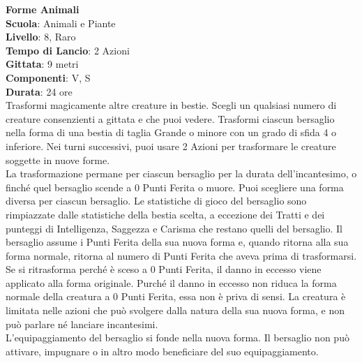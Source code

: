 \begin{multicols}{2}
\medskip\textbf{Forme Animali}\\
\textbf{Scuola}: Animali e Piante\\
\textbf{Livello}: 8, Raro\\
\textbf{Tempo di Lancio}: 2 Azioni\\
\textbf{Gittata}: 9 metri\\
\textbf{Componenti}: V, S\\
\textbf{Durata}: 24 ore\\
Trasformi magicamente altre creature in bestie. Scegli un qualsiasi numero di creature consenzienti a gittata e che puoi vedere. Trasformi ciascun bersaglio nella forma di una bestia di taglia Grande o minore con un grado di sfida 4 o inferiore. Nei turni successivi, puoi usare 2 Azioni per trasformare le creature soggette in nuove forme.\\
La trasformazione permane per ciascun bersaglio per la durata dell'incantesimo, o finché quel bersaglio scende a 0 Punti Ferita o muore. Puoi scegliere una forma diversa per ciascun bersaglio. Le statistiche di gioco del bersaglio sono rimpiazzate dalle statistiche della bestia scelta, a eccezione dei Tratti e dei punteggi di Intelligenza, Saggezza e Carisma che restano quelli del
bersaglio. Il bersaglio assume i Punti Ferita della sua nuova forma e, quando ritorna alla sua forma normale, ritorna al numero di Punti Ferita che aveva prima di trasformarsi. Se si ritrasforma perché è sceso a 0 Punti Ferita, il danno in eccesso viene applicato alla forma originale. Purché il danno in eccesso non riduca la forma normale della creatura a 0 Punti Ferita, essa non è priva di sensi. La creatura è limitata nelle azioni che può svolgere dalla natura della sua nuova forma, e non può parlare né lanciare incantesimi.\\
L'equipaggiamento del bersaglio si fonde nella nuova forma. Il bersaglio non può attivare, impugnare o in altro modo beneficiare del suo equipaggiamento.


\end{multicols}

